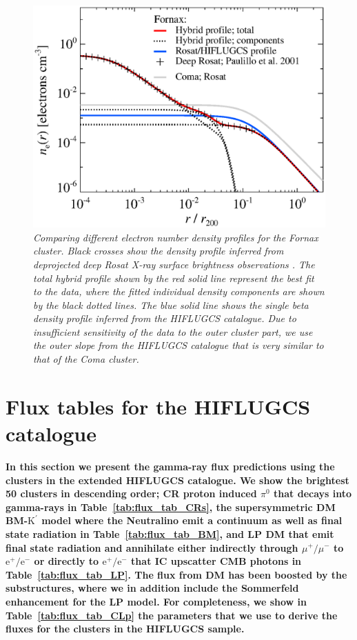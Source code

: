 \documentclass[10pt,aps,pra,reprint,amsmath,amsfonts,amssymb,showpacs,nofootinbib,floatfix]{revtex4-1}
\def\C#1{{\bf #1}}
\newcommand{\rmn}{\mathrm}
\newcommand{\Kp}{\rmn{K}^\prime}
\begin{document}
\begin{figure}%
 \includegraphics[width=0.99\columnwidth]{figures/dens.fornax.eps}
 \caption{\it Comparing different electron number density profiles for
   the Fornax cluster. Black crosses show the density profile inferred
   from deprojected deep Rosat X-ray surface brightness observations
   \protect \cite{2002ApJ...565..883P}. The total hybrid profile shown
   by the red solid line represent the best fit to the data, where the
   fitted individual density components are shown by the black dotted
   lines. The blue solid line shows the single beta density profile
   inferred from the HIFLUGCS catalogue. Due to insufficient
   sensitivity of the data to the outer cluster part, we use the outer
   slope from the HIFLUGCS catalogue that is very similar to that of
   the Coma cluster.}
 \label{fig:dens_fornax}
\end{figure}


\section{Flux tables for the HIFLUGCS catalogue}

\C{In this section we present the gamma-ray flux predictions using the
clusters in the extended HIFLUGCS catalogue. We show the brightest 50
clusters in descending order; CR proton induced $\pi^0$ that decays
into gamma-rays in Table~\ref{tab:flux_tab_CRs}, the supersymmetric DM
BM-$\Kp$ model where the Neutralino emit a continuum as well as final
state radiation in Table~\ref{tab:flux_tab_BM}, and LP DM that emit
final state radiation and annihilate either indirectly through
$\mu^+/\mu^-$ to $\rmn{e}^+/\rmn{e}^-$ or directly to
$\rmn{e}^+/\rmn{e}^-$ that IC upscatter CMB photons in
Table~\ref{tab:flux_tab_LP}. The flux from DM has been boosted by the
substructures, where we in addition include the Sommerfeld enhancement
for the LP model.  
For completeness, we show in Table~\ref{tab:flux_tab_CLp} the
parameters that we use to derive the fluxes for the clusters in the
HIFLUGCS sample.}
\end{document}
